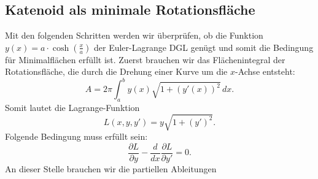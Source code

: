 \subsection{Katenoid als minimale Rotationsfläche
	\label{Das Katenoid:subsection:Katenoid als minimale Rotationsfläche}}
Mit den folgenden Schritten werden wir überprüfen, ob die Funktion  \( y(x) = a \cdot \cosh \left( \frac{x}{a} \right) \) der Euler-Lagrange DGL genügt und somit die Bedingung für Minimalflächen erfüllt ist.
Zuerst brauchen wir das Flächenintegral der Rotationsfläche, die durch die Drehung einer Kurve um die $x$-Achse entsteht:
\begin{equation}
	A = 2\pi \int_{a}^{b} y(x) \sqrt{1 + (y'(x))^2} \,dx.
\end{equation}
Somit lautet die Lagrange-Funktion 
\begin{equation}
	L(x, y, y') = y \sqrt{1 + (y')^2}.	
\end{equation}
Folgende Bedingung muss erfüllt sein: 
\begin{equation}
	\frac{\partial L}{\partial y} - \frac{d}{dx}  \frac{\partial L}{\partial y'} = 0.
\end{equation}
An dieser Stelle brauchen wir die partiellen Ableitungen

